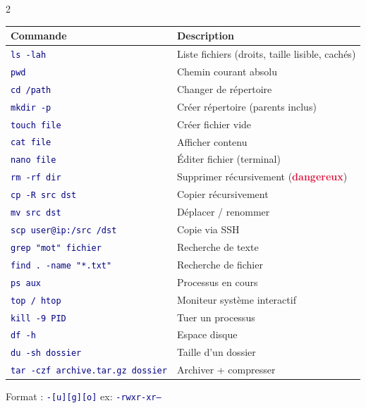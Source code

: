 \documentclass[a4paper,10pt]{article}
\newcommand{\warn}[1]{\textbf{\textcolor{crimson}{#1}}}
\newcommand{\cmd}[1]{\texttt{\textcolor{navy}{#1}}}
\begin{document}
\begin{multicols}{2}
\begin{tcolorbox}[basebox, colframe=green, title=2. Commandes essentielles]
\begin{tabularx}{\columnwidth}{lX}
\toprule
\textbf{Commande} & \textbf{Description} \\
\midrule
\cmd{ls -lah}    & Liste fichiers (droits, taille lisible, cachés) \\
\cmd{pwd}        & Chemin courant absolu \\
\cmd{cd /path}   & Changer de répertoire \\
\cmd{mkdir -p}   & Créer répertoire (parents inclus) \\
\cmd{touch file} & Créer fichier vide \\
\cmd{cat file}   & Afficher contenu \\
\cmd{nano file}  & Éditer fichier (terminal) \\
\cmd{rm -rf dir} & Supprimer récursivement (\warn{dangereux}) \\
\cmd{cp -R src dst} & Copier récursivement \\
\cmd{mv src dst} & Déplacer / renommer \\
\cmd{scp user@ip:/src /dst} & Copie via SSH \\
\cmd{grep "mot" fichier} & Recherche de texte \\
\cmd{find . -name "*.txt"} & Recherche de fichier \\
\cmd{ps aux}     & Processus en cours \\
\cmd{top / htop} & Moniteur système interactif \\
\cmd{kill -9 PID} & Tuer un processus \\
\cmd{df -h}      & Espace disque \\
\cmd{du -sh dossier} & Taille d'un dossier \\
\cmd{tar -czf archive.tar.gz dossier} & Archiver + compresser \\
\bottomrule
\end{tabularx}
\end{tcolorbox}

\begin{tcolorbox}[basebox, colframe=orange, title=3. Gestion des permissions (chmod)]
Format : \cmd{-[u][g][o]} \quad ex: \cmd{-rwxr-xr--}\\[4pt]


\end{tcolorbox}
\end{multicols}
\end{document}
